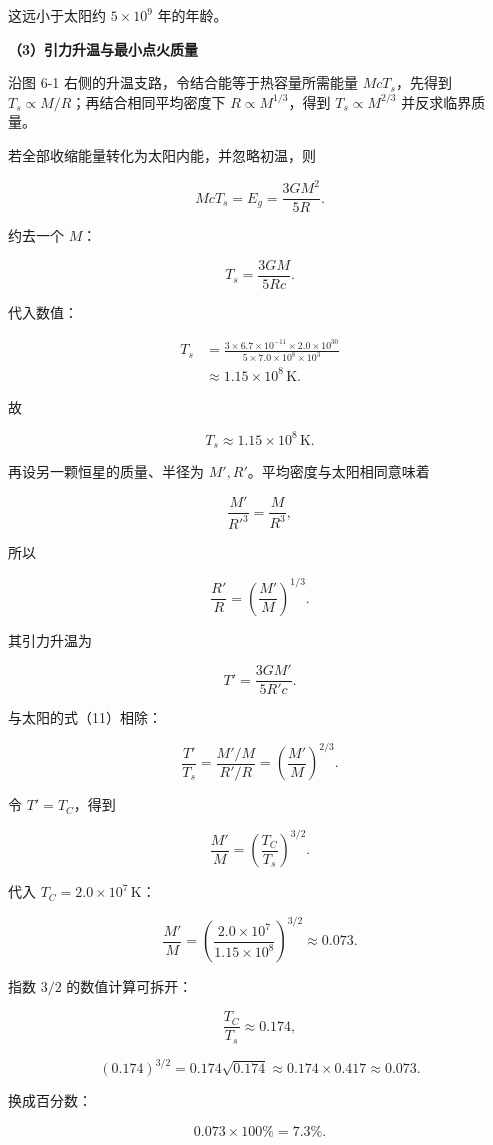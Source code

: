 \documentclass[12pt,a4paper,UTF8]{ctexart}
\begin{document}
这远小于太阳约 \(5\times10^9\) 年的年龄。

\textbf{（3）引力升温与最小点火质量}

沿图 6-1 右侧的升温支路，令结合能等于热容量所需能量 \(McT_s\)，先得到
\(T_s\propto M/R\)；再结合相同平均密度下 \(R\propto M^{1/3}\)，得到
\(T_s\propto M^{2/3}\) 并反求临界质量。

若全部收缩能量转化为太阳内能，并忽略初温，则

\[McT_s=E_g=\frac{3GM^2}{5R}.\]

约去一个 \(M\)：

\[T_s=\frac{3GM}{5Rc}. \tag{11}\]

代入数值：

\[\begin{aligned}
T_s
&=\frac{3\times6.7\times10^{-11}\times2.0\times10^{30}}
{5\times7.0\times10^8\times10^3}\\
&\approx1.15\times10^8\,\mathrm K.
\end{aligned}\]

故

\[\boxed{T_s\approx1.15\times10^8\,\mathrm K}. \tag{12}\]

再设另一颗恒星的质量、半径为 \(M',R'\)。平均密度与太阳相同意味着

\[\frac{M'}{R'^3}=\frac{M}{R^3},\]

所以

\[\frac{R'}{R}=\left(\frac{M'}{M}\right)^{1/3}. \tag{13}\]

其引力升温为

\[T' =\frac{3GM'}{5R'c}.\]

与太阳的式（11）相除：

\[\frac{T'}{T_s}
=\frac{M'/M}{R'/R}
=\left(\frac{M'}{M}\right)^{2/3}. \tag{14}\]

令 \(T'=T_C\)，得到

\[\frac{M'}{M}=\left(\frac{T_C}{T_s}\right)^{3/2}. \tag{15}\]

代入 \(T_C=2.0\times10^7\,\mathrm K\)：

\[\frac{M'}{M}
=\left(\frac{2.0\times10^7}{1.15\times10^8}\right)^{3/2}
\approx0.073. \tag{16}\]

指数 \(3/2\) 的数值计算可拆开：

\[\frac{T_C}{T_s}\approx0.174,\]

\[\left(0.174\right)^{3/2}
=0.174\sqrt{0.174}
\approx0.174\times0.417
\approx0.073.\]

换成百分数：

\[0.073\times100\%=7.3\%.\]
\end{document}
